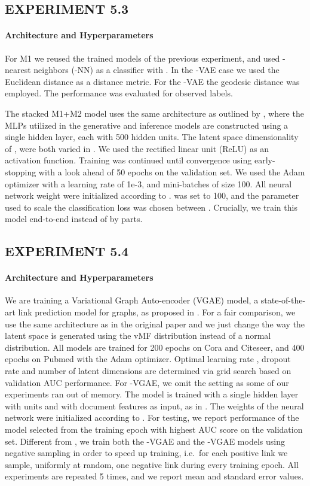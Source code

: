 \documentclass[letterpaper]{article}
\newcommand{\Sv}{}
\newcommand{\Nv}{}
\begin{document}
\subsection{EXPERIMENT 5.3}
\paragraph{Architecture and Hyperparameters}
For M1 we reused the trained models of the previous experiment, and used -nearest neighbors (-NN) as a classifier with . In the -VAE case we used the Euclidean distance as a distance metric. For the \Sv-VAE the geodesic distance  was employed. The performance was evaluated for  observed labels.

The stacked M1+M2 model uses the same architecture as outlined by \cite{kingma-semi-super}, where the MLPs utilized in the generative and inference models are constructed using a single hidden layer, each with 500 hidden units. The latent space dimensionality of ,  were both varied in . We used the rectified linear unit (ReLU) as an activation function. Training was continued until convergence using early-stopping with a look ahead of 50 epochs on the validation set. We used the Adam optimizer with a learning rate of 1e-3, and mini-batches of size 100. All neural network weight were initialized according to \citep{glorot2010understanding}.  was set to 100, and the  parameter used to scale the classification loss was chosen between . Crucially, we train this model end-to-end instead of by parts.

\subsection{EXPERIMENT 5.4}\label{ap:link-pred}
\paragraph{Architecture and Hyperparameters} We are training a Variational Graph Auto-encoder (VGAE) model, a state-of-the-art link prediction model for graphs, as proposed in \citet{kipf2016VGAE}. For a fair comparison, we use the same architecture as in the original paper and we just change the way the latent space is generated using the vMF distribution instead of a normal distribution. All models are trained for 200 epochs on Cora and Citeseer, and 400 epochs on Pubmed with the Adam optimizer. Optimal learning rate , dropout rate  and number of latent dimensions  are determined via grid search based on validation AUC performance. For \Sv-VGAE, we omit the  setting as some of our experiments ran out of memory. The model is trained with a single hidden layer with  units and with document features as input, as in \citet{kipf2016VGAE}. The weights of the neural network were initialized according to \citep{glorot2010understanding}. For testing, we report performance of the model selected from the training epoch with highest AUC score on the validation set. Different from \citep{kipf2016VGAE}, we train both the \Nv-VGAE and the \Sv-VGAE models using negative sampling in order to speed up training, i.e.~for each positive link we sample, uniformly at random, one negative link during every training epoch. All experiments are repeated 5 times, and we report mean and standard error values.
\end{document}
